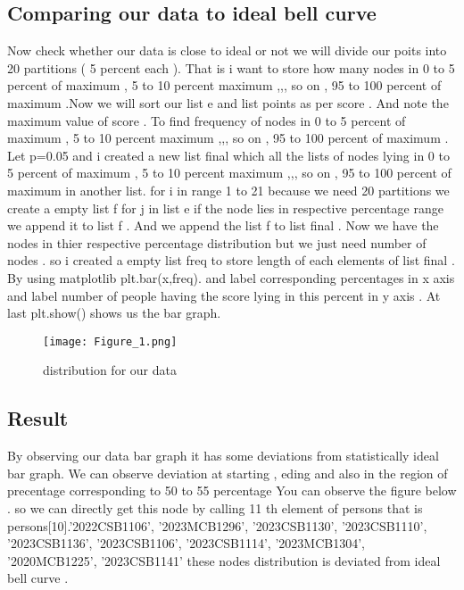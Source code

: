 \documentclass{article}
\begin{document}
\subsection{Comparing our data to ideal bell curve }
Now check whether our data is close to ideal or not we will divide our poits into 20 partitions ( 5 percent each ). That is i want to store how many nodes in 0 to 5 percent of maximum  , 5 to 10 percent maximum ,,, so on , 95 to 100 percent of maximum .Now we will sort our list e and list points as per score .
And note the maximum value of score . To find frequency of nodes in 0 to 5 percent of maximum  , 5 to 10 percent maximum ,,, so on , 95 to 100 percent of maximum . Let p=0.05 and i created a new list final which all the lists of nodes lying in 0 to 5 percent of maximum  , 5 to 10 percent maximum ,,, so on , 95 to 100 percent of maximum in another list. for i in range 1 to 21 because we need 20 partitions we create a empty list f for j in list e if the node lies in respective percentage range we append it to list f . And we append the list f to list final . Now we have the nodes in thier respective percentage distribution but we just need number of nodes . so i created a empty list freq to store length of each elements of list final .  By using matplotlib plt.bar(x,freq). and label corresponding percentages in x axis and label number of people having the score lying in this percent in y axis . At last plt.show() shows us the bar graph.



\begin{figure}
    \centering
    \texttt{[image: Figure\_1.png]}
    \caption{distribution for our data}
    \label{fig:enter-label}
\end{figure}
\subsection{Result} By observing our data bar graph it has some deviations from statistically ideal  bar graph. We can observe deviation at starting , eding and also in the region of precentage corresponding to 50 to 55 percentage You can observe the figure below . so we can directly get this node by calling 11 th element of persons that is persons[10].'2022CSB1106', '2023MCB1296', '2023CSB1130', '2023CSB1110', '2023CSB1136', '2023CSB1106', '2023CSB1114', '2023MCB1304', '2020MCB1225', '2023CSB1141' these nodes distribution is deviated from ideal bell curve .
\end{document}
